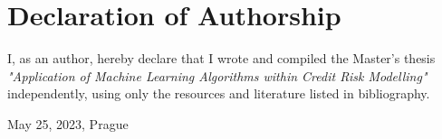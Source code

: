 \vfill

\vglue 14cm

\section*{Declaration of Authorship}
I, as an author, hereby declare that I wrote and compiled the Master's thesis {\it{"Application of Machine Learning Algorithms within Credit Risk Modelling"}} independently, using only the resources and literature listed in bibliography.

\bigskip 

\vspace{0.5cm}


\begin{flushleft}
May 25, 2023, Prague 
\end{flushleft}
\vspace{-0.5cm}
\begin{flushright}
\AuthorDP
\end{flushright}

